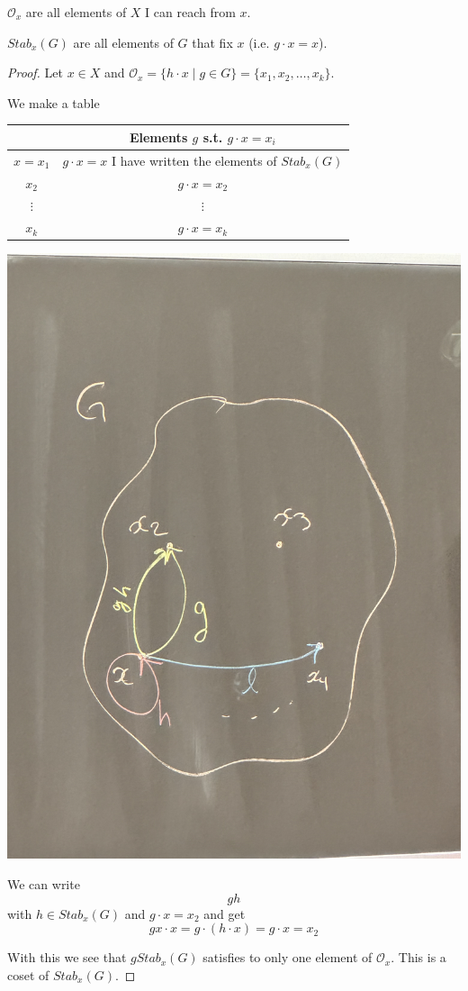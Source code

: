 \begin{listu}
    \item $\mathcal{O}_x$ are all elements of $X$ I can reach from $x$. 
    \item $Stab_x(G)$ are all elements of $G$ that fix $x$ (i.e. $g \cdot x = x$).
\end{listu}

\begin{proof}
    Let $x \in X$ and $\mathcal{O}_x = \{ h \cdot x \mid g \in G \} = \{ x_1, x_2, \dots, x_k \}$.

    We make a table \begin{table}[ht!]
        \centering
        \begin{tabular}{c|c}
                      & Elements $g$  s.t. $g \cdot x = x_i$                       \\ \hline
            $x = x_1$ & $g \cdot x = x$ I have written the elements of $Stab_x(G)$ \\ \hline
            $x_2$     & $g \cdot x = x_2$                                          \\ \hline
            $\vdots$  & $\vdots$                                                   \\ \hline
            $x_k$     & $g \cdot x = x_k$
        \end{tabular}
    \end{table}
    \begin{center}
        \includegraphics[width=0.2\linewidth]{figures/orbit-stabilizer-proof.jpg}
    \end{center}

    We can write \[
        gh
    \] with $h \in Stab_x(G)$ and $g \cdot x = x_2$ and get \[
        gx \cdot x = g \cdot (h \cdot x) = g \cdot x = x_2
    \]

    With this we see that $g Stab_x(G)$ satisfies to only one element of $\mathcal{O}_x$. This is a coset of $Stab_x(G)$.


\end{proof}
